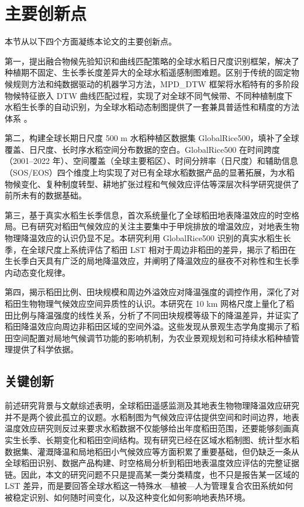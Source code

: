 \section{主要创新点}

本节从以下四个方面凝练本论文的主要创新点。

第一，提出融合物候先验知识和曲线匹配策略的全球水稻日尺度识别框架，解决了种植期不固定、生长季长度差异大的全球水稻遥感制图难题。区别于传统的固定物候规则方法和纯数据驱动的机器学习方法，MPD\_DTW 框架将水稻特有的多阶段物候特征嵌入 DTW 曲线匹配过程，实现了对全球不同气候带、不同种植制度下水稻生长季的自动识别，为全球水稻动态制图提供了一套兼具普适性和精度的方法体系 \cite{Dong2016, Xiao2006}。

第二，构建全球长期日尺度 500 m 水稻种植区数据集 GlobalRice500，填补了全球覆盖、日尺度、长时序水稻空间分布数据的空白。GlobalRice500 在时间跨度（2001--2022 年）、空间覆盖（全球主要稻区）、时间分辨率（日尺度）和辅助信息（SOS/EOS）四个维度上均实现了对已有全球水稻数据产品的显著拓展，为水稻物候变化、复种制度转型、耕地扩张过程和气候效应评估等深层次科学研究提供了前所未有的数据基础。

第三，基于真实水稻生长季信息，首次系统量化了全球稻田地表降温效应的时空格局。已有研究对稻田气候效应的关注主要集中于甲烷排放的增温效应，对地表生物物理降温效应的认识仍显不足。本研究利用 GlobalRice500 识别的真实水稻生长季，在全球尺度上系统评估了稻田 LST 相对于周边非稻田的差异，揭示了稻田在生长季白天具有广泛的局地降温效应，并阐明了降温效应的昼夜不对称性和生长季内动态变化规律。

第四，揭示稻田比例、田块规模和周边外溢效应对降温强度的调控作用，深化了对稻田生物物理气候效应空间异质性的认识。本研究在 10 km 网格尺度上量化了稻田比例与降温强度的线性关系，分析了不同田块规模等级下的降温差异，并证实了稻田降温效应向周边非稻田区域的空间外溢。这些发现从景观生态学角度揭示了稻田空间配置对局地气候调节功能的影响机制，为农业景观规划和可持续水稻种植管理提供了科学依据。

\subsection{关键创新}

前述研究背景与文献综述表明，全球稻田遥感监测及其地表生物物理降温效应研究并不是两个彼此孤立的议题。水稻制图为气候效应评估提供空间和时间边界，地表温度效应研究则反过来要求水稻数据不仅能够给出年度稻田范围，还要能够刻画真实生长季、长期变化和稻田空间结构。现有研究已经在区域水稻制图、统计型水稻数据集、灌溉降温和局地稻田小气候效应等方面积累了重要基础，但仍缺乏一条从全球稻田识别、数据产品构建、时空格局分析到稻田地表温度效应评估的完整证据链。因此，本文的研究问题不只是提高某一类分类精度，也不只是报告某一区域的 LST 差异，而是要回答全球水稻这一特殊水—植被—人为管理复合农田系统如何被稳定识别、如何随时间变化，以及这种变化如何影响地表热环境。


